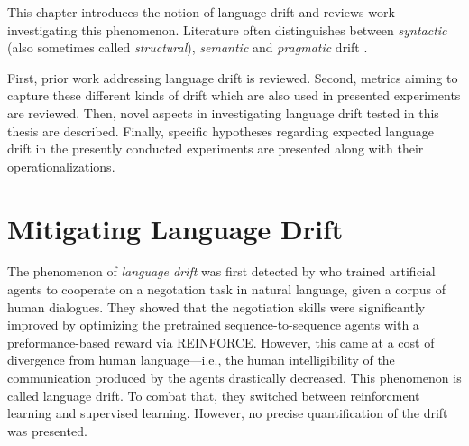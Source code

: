 This chapter introduces the notion of language drift and reviews work investigating this phenomenon. Literature often distinguishes between \textit{syntactic} (also sometimes called \textit{structural}), \textit{semantic} and \textit{pragmatic} drift \parencite{lazaridou2020multi}. 

First, prior work addressing language drift is reviewed. Second, metrics aiming to capture these different kinds of drift which are also used in presented experiments are reviewed. Then, novel aspects in investigating language drift tested in this thesis are described. Finally, specific hypotheses regarding expected language drift in the presently conducted experiments are presented along with their operationalizations. 

\section{Mitigating Language Drift}

The phenomenon of \textit{language drift} was first detected by \cite{lewis2017deal} who trained artificial agents to cooperate on a negotation task in natural language, given a corpus of human dialogues. They showed that the negotiation skills were significantly improved by optimizing the pretrained sequence-to-sequence agents with a preformance-based reward via REINFORCE. However, this came at a cost of divergence from human language---i.e., the human intelligibility of the communication produced by the agents drastically decreased. This phenomenon is called language drift. To combat that, they switched between reinforcment learning and supervised learning. However, no precise quantification of the drift was presented. 

